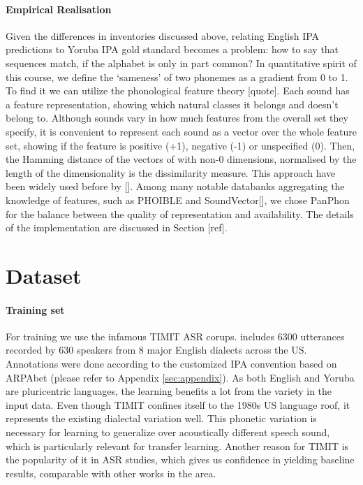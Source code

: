 \documentclass[11pt]{article}
\begin{document}
\paragraph{Empirical Realisation} Given the differences in inventories discussed above, relating English IPA predictions to Yoruba IPA gold standard becomes a problem: how to say that sequences match, if the alphabet is only in part common? In quantitative spirit of this course,
we define the `sameness' of two phonemes as a gradient from 0 to 1. To find it we can utilize the phonological feature theory [quote].
Each sound has a feature representation, showing which natural classes it belongs and doesn't belong to. Although sounds vary in how much features from the overall set they specify, it is convenient to represent each sound as a vector over the whole feature set,
showing if the feature is positive (+1), negative (-1) or unspecified (0). Then, the Hamming distance of the vectors of with non-0 dimensions, normalised by the length of the dimensionality is the dissimilarity measure. This approach have been widely used before by []. Among many notable databanks aggregating the knowledge of features, such as PHOIBLE \cite{moran2014} and SoundVector[], we chose PanPhon \cite{mortensen2016} for the balance between the quality of representation and availability. The details of the implementation are discussed in Section [ref].

\section{Dataset}
\paragraph{Training set} For training we use the infamous TIMIT ASR corups. \cite{garofolo1993timit} includes 6300 utterances recorded by 630 speakers from 8 major English dialects across the US. Annotations were done according to the customized IPA convention based on ARPAbet \cite{cmudict} (please refer to Appendix \ref{sec:appendix}). As both English and Yoruba are pluricentric languages, the learning benefits a lot from the variety in the input data. Even though TIMIT confines itself to the 1980s US language roof, it represents the existing dialectal variation well. This phonetic variation is necessary for learning to generalize over acoustically different speech sound, which is particularly relevant for transfer learning. Another reason for TIMIT is the popularity of it in ASR studies, which gives us confidence in yielding baseline results, comparable with other works in the area.
\end{document}
